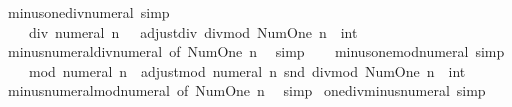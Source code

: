 \begin{isabellebody}
\isamarkupfalse%
%
\endisatagproof
{\isafoldproof}%
%
\isadelimproof
\isanewline
%
\endisadelimproof
\isanewline
{}\isamarkupfalse%
\ minus{\isacharunderscore}{\kern0pt}one{\isacharunderscore}{\kern0pt}div{\isacharunderscore}{\kern0pt}numeral\ {\isacharbrackleft}{\kern0pt}simp{\isacharbrackright}{\kern0pt}{\isacharcolon}{\kern0pt}\isanewline
\ \ {\isachardoublequoteopen}{\isacharminus}{\kern0pt}\ {}\ div\ numeral\ n\ {\isacharequal}{\kern0pt}\ {\isacharminus}{\kern0pt}\ {\isacharparenleft}{\kern0pt}adjust{\isacharunderscore}{\kern0pt}div\ {\isacharparenleft}{\kern0pt}divmod\ Num{\isachardot}{\kern0pt}One\ n{\isacharparenright}{\kern0pt}\ {\isacharcolon}{\kern0pt}{\isacharcolon}{\kern0pt}\ int{\isacharparenright}{\kern0pt}{\isachardoublequoteclose}\isanewline
%
\isadelimproof
\ \ %
\endisadelimproof
%
\isatagproof
{}\isamarkupfalse%
\ minus{\isacharunderscore}{\kern0pt}numeral{\isacharunderscore}{\kern0pt}div{\isacharunderscore}{\kern0pt}numeral\ {\isacharbrackleft}{\kern0pt}of\ Num{\isachardot}{\kern0pt}One\ n{\isacharbrackright}{\kern0pt}\ \isamarkupfalse%
\ simp%
\endisatagproof
{\isafoldproof}%
%
\isadelimproof
\ \ \isanewline
%
\endisadelimproof
\isanewline
{}\isamarkupfalse%
\ minus{\isacharunderscore}{\kern0pt}one{\isacharunderscore}{\kern0pt}mod{\isacharunderscore}{\kern0pt}numeral\ {\isacharbrackleft}{\kern0pt}simp{\isacharbrackright}{\kern0pt}{\isacharcolon}{\kern0pt}\isanewline
\ \ {\isachardoublequoteopen}{\isacharminus}{\kern0pt}\ {}\ mod\ numeral\ n\ {\isacharequal}{\kern0pt}\ adjust{\isacharunderscore}{\kern0pt}mod\ {\isacharparenleft}{\kern0pt}numeral\ n{\isacharparenright}{\kern0pt}\ {\isacharparenleft}{\kern0pt}snd\ {\isacharparenleft}{\kern0pt}divmod\ Num{\isachardot}{\kern0pt}One\ n{\isacharparenright}{\kern0pt}\ {\isacharcolon}{\kern0pt}{\isacharcolon}{\kern0pt}\ int{\isacharparenright}{\kern0pt}{\isachardoublequoteclose}\isanewline
%
\isadelimproof
\ \ %
\endisadelimproof
%
\isatagproof
{}\isamarkupfalse%
\ minus{\isacharunderscore}{\kern0pt}numeral{\isacharunderscore}{\kern0pt}mod{\isacharunderscore}{\kern0pt}numeral\ {\isacharbrackleft}{\kern0pt}of\ Num{\isachardot}{\kern0pt}One\ n{\isacharbrackright}{\kern0pt}\ \isamarkupfalse%
\ simp%
\endisatagproof
{\isafoldproof}%
%
\isadelimproof
\isanewline
%
\endisadelimproof
\isanewline
{}\isamarkupfalse%
\ one{\isacharunderscore}{\kern0pt}div{\isacharunderscore}{\kern0pt}minus{\isacharunderscore}{\kern0pt}numeral\ {\isacharbrackleft}{\kern0pt}simp{\isacharbrackright}{\kern0pt}{\isacharcolon}{\kern0pt}\isanewline

\end{isabellebody}

